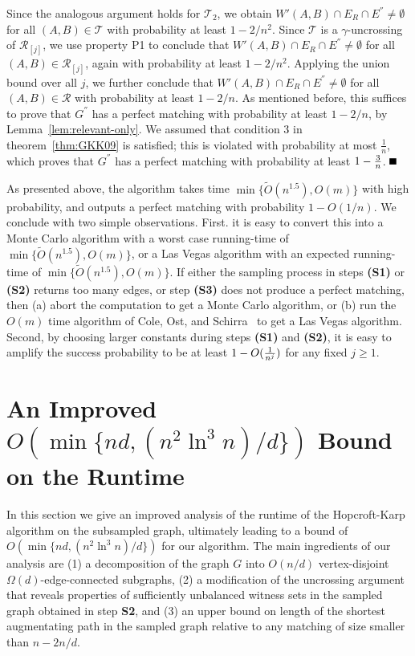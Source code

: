 \documentclass[11pt]{article}
\newcommand{\qed}{\mbox{}\hspace*{\fill}\nolinebreak\mbox{$\rule{0.6em}{0.6em}$}
}
\newenvironment{proof}{{\bf Proof:}}{$\qed$\par}
\newcommand{\coll}{{\mathcal R}}
\newcommand{\colltwo}{{\mathcal T}}
\begin{document}
\begin{proof}
  Since the analogous argument holds for $\colltwo_2$, we obtain $W'(A,B) \cap
  E_R \cap E^{''}\neq \emptyset$ for all $(A,B) \in \colltwo$ with probability
  at least $1-2/n^2$. Since $\colltwo$ is a $\gamma$-uncrossing of
  $\coll_{[j]}$, we use property P1 to conclude that $W'(A,B) \cap E_R \cap
  E^{''}\neq \emptyset$ for all $(A,B) \in \coll_{[j]}$, again with
  probability at least $1-2/n^2$. Applying the union bound over all $j$, we
  further conclude that $W'(A,B) \cap E_R \cap E^{''}\neq \emptyset$ for all
  $(A,B) \in \coll$ with probability at least $1-2/n$. As mentioned before,
  this suffices to prove that $G^{''}$ has a perfect matching with probability
  at least $1-2/n$, by Lemma~\ref{lem:relevant-only}.  We assumed that
  condition 3 in theorem~\ref{thm:GKK09} is satisfied; this is violated with
  probability at most $\frac{1}{n}$, which proves that $G^{''}$ has a perfect
  matching with probability at least $1-{3\over n}$.
\end{proof}


As presented above, the algorithm takes time $\min\{\tilde{O}(n^{1.5}),
O(m)\}$ with high probability, and outputs a perfect matching with probability
$1- O(1/n)$. We conclude with two simple observations. First.  it is easy to
convert this into a Monte Carlo algorithm with a worst case running-time of
$\min\{\tilde{O}(n^{1.5}), O(m)\}$, or a Las Vegas algorithm with an expected
running-time of $\min\{\tilde{O}(n^{1.5}), O(m)\}$.  If either the sampling
process in steps {\bf (S1)} or {\bf (S2)} returns too many edges, or step {\bf
  (S3)} does not produce a perfect matching, then (a) abort the computation to
get a Monte Carlo algorithm, or (b) run the $O(m)$ time algorithm of Cole,
Ost, and Schirra~\cite{cos:regular2001} to get a Las Vegas algorithm. Second,
by choosing larger constants during steps {\bf (S1)} and {\bf (S2)}, it is
easy to amplify the success probability to be at least $1-O({1\over n^j})$ for
any fixed $j \ge 1$.

\section{An Improved $O\left(\min\{nd, (n^2\ln^3 n)/d\}\right)$ Bound on the
  Runtime} \label{sec:improved-runtime} 
 In this section we give an improved analysis of the runtime of the Hopcroft-Karp algorithm on the subsampled graph, ultimately leading to a bound of 
 $O\left(\min\{nd, (n^2\ln^3 n)/d\}\right)$ for our algorithm. The main ingredients of our analysis are (1) a decomposition of the graph $G$ into $O(n/d)$ vertex-disjoint $\Omega(d)$-edge-connected subgraphs,  (2) a modification of the uncrossing argument that reveals properties of sufficiently unbalanced witness sets in the sampled graph obtained in step \textbf{S2}, and (3) an upper bound on 	length of the shortest augmentating path in the sampled graph relative to any matching of size smaller than $n-2n/d$. 
\end{document}
